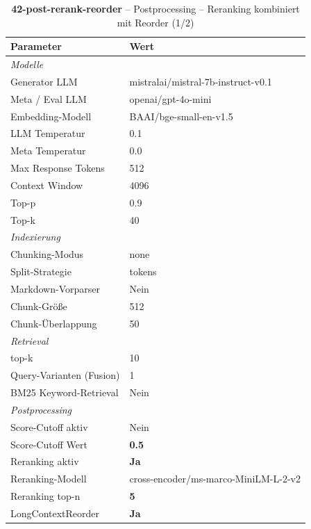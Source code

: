 \begin{table}[H]
\centering
\small
\setlength{\tabcolsep}{4pt}
\begin{tabular}{lp{8cm}}
\toprule
\textbf{Parameter} & \textbf{Wert} \\
\midrule
\multicolumn{2}{l}{\textit{Modelle}} \\
\midrule
\quad Generator LLM & mistralai/mistral-7b-instruct-v0.1 \\
\quad Meta / Eval LLM & openai/gpt-4o-mini \\
\quad Embedding-Modell & BAAI/bge-small-en-v1.5 \\
\quad LLM Temperatur & 0.1 \\
\quad Meta Temperatur & 0.0 \\
\quad Max Response Tokens & 512 \\
\quad Context Window & 4096 \\
\quad Top-p & 0.9 \\
\quad Top-k & 40 \\
\midrule
\multicolumn{2}{l}{\textit{Indexierung}} \\
\midrule
\quad Chunking-Modus & none \\
\quad Split-Strategie & tokens \\
\quad Markdown-Vorparser & Nein \\
\quad Chunk-Größe & 512 \\
\quad Chunk-Überlappung & 50 \\
\midrule
\multicolumn{2}{l}{\textit{Retrieval}} \\
\midrule
\quad top-k & 10 \\
\quad Query-Varianten (Fusion) & 1 \\
\quad BM25 Keyword-Retrieval & Nein \\
\midrule
\multicolumn{2}{l}{\textit{Postprocessing}} \\
\midrule
\quad Score-Cutoff aktiv & Nein \\
\quad Score-Cutoff Wert & \textbf{0.5} \\
\quad Reranking aktiv & \textbf{Ja} \\
\quad Reranking-Modell & cross-encoder/ms-marco-MiniLM-L-2-v2 \\
\quad Reranking top-n & \textbf{5} \\
\quad LongContextReorder & \textbf{Ja} \\
\bottomrule
\end{tabular}
\caption{\textbf{42-post-rerank-reorder} -- Postprocessing -- Reranking kombiniert mit Reorder (1/2)}
\label{tab:config_42_post_rerank_reorder_a}
\end{table}

